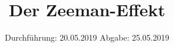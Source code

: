 

\subject{VERSUCH NUMMER 27}
\title{Der Zeeman-Effekt}
\date{
  Durchführung: 20.05.2019
  \hspace{3em}
  Abgabe: 25.05.2019
}



\thispagestyle{empty}
\maketitle
\thispagestyle{empty}
\tableofcontents
\newpage
\setcounter{page}{1}


% 




\nocite{*}
\printbibliography


